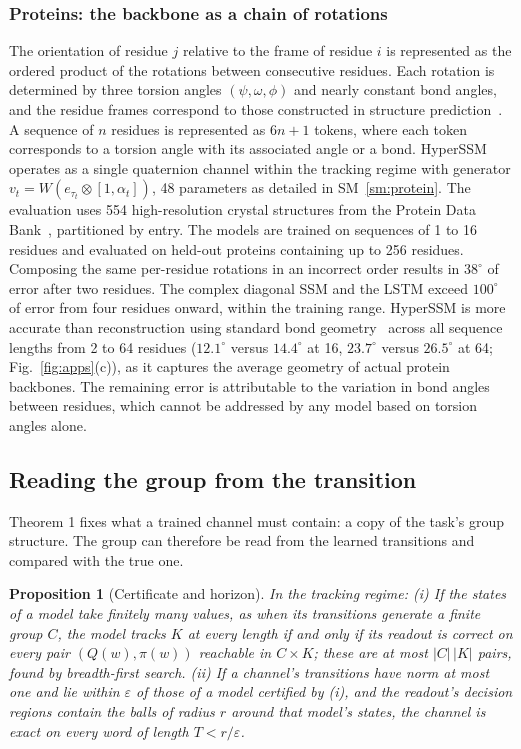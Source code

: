 \documentclass[aps,prx,reprint,superscriptaddress,longbibliography,nofootinbib,floatfix]{revtex4-2}
\theoremstyle{plain}
\newtheorem{proposition}{Proposition}
\theoremstyle{definition}
\begin{document}
\subsubsection{Proteins: the backbone as a chain of rotations}
The orientation of residue $j$ relative to the frame of residue $i$ is represented as the ordered product of the rotations between consecutive residues. Each rotation is determined by three torsion angles $(\psi,\omega,\phi)$ and nearly constant bond angles, and the residue frames correspond to those constructed in structure prediction~\cite{alphafold}. A sequence of $n$ residues is represented as $6n+1$ tokens, where each token corresponds to a torsion angle with its
associated angle or a bond. HyperSSM operates as a single quaternion channel within the tracking regime with generator $v_t=W(e_{\tau_t}\otimes[1,\alpha_t])$, 48 parameters as detailed in SM~\ref{sm:protein}. The evaluation uses 554 high-resolution crystal structures from the Protein Data Bank~\cite{pdb}, partitioned by entry. The models are trained on sequences of 1 to 16 residues and evaluated on held-out proteins containing up to 256 residues. Composing the same per-residue rotations in an incorrect order results in $38^\circ$ of error after two residues. The complex diagonal SSM and the LSTM exceed $100^\circ$ of error from four residues onward, within the training range. HyperSSM is more accurate than reconstruction using standard bond geometry~\cite{engh_huber} across all sequence lengths from 2 to 64 residues ($12.1^\circ$ versus $14.4^\circ$ at 16,
$23.7^\circ$ versus $26.5^\circ$ at 64; Fig.~\ref{fig:apps}(c)), as it
captures the average geometry of actual protein backbones. The remaining error is attributable to the variation in bond angles between residues, which cannot be addressed by any model based on torsion angles alone.


\subsection{Reading the group from the transition}

Theorem 1 fixes what a trained channel must contain: a copy of the task's group structure. The group can therefore be read from the learned transitions and compared with the true one.

\begin{proposition}[Certificate and horizon]\label{prop:read}
In the tracking regime: (i) If the states of a model take finitely many
values, as when its transitions generate a finite group $C$, the model
tracks $K$ at every length if and only if its readout is correct on every
pair $(Q(w),\pi(w))$ reachable in $C\times K$; these are at most
$|C|\,|K|$ pairs, found by breadth-first search. (ii) If a channel's
transitions have norm at most one and lie within $\varepsilon$ of those of a
model certified by (i), and the readout's decision regions contain the balls
of radius $r$ around that model's states, the channel is exact on every word
of length $T<r/\varepsilon$.
\end{proposition}
\end{document}

